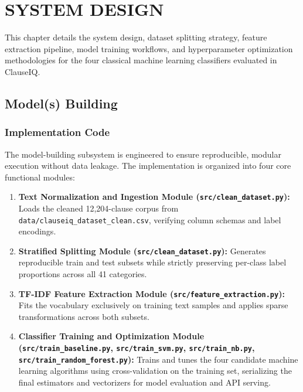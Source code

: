 \chapter{SYSTEM DESIGN}
\label{ch:system_design}

This chapter details the system design, dataset splitting strategy, feature extraction pipeline, model training workflows, and hyperparameter optimization methodologies for the four classical machine learning classifiers evaluated in ClauseIQ.

\section{Model(s) Building}
\label{sec:model_building}

\subsection{Implementation Code}
\label{subsec:implementation_code}
The model-building subsystem is engineered to ensure reproducible, modular execution without data leakage. The implementation is organized into four core functional modules:
\begin{enumerate}
    \item \textbf{Text Normalization and Ingestion Module (\texttt{src/clean\_dataset.py}):} Loads the cleaned 12,204-clause corpus from \texttt{data/clauseiq\_dataset\_clean.csv}, verifying column schemas and label encodings.
    \item \textbf{Stratified Splitting Module (\texttt{src/clean\_dataset.py}):} Generates reproducible train and test subsets while strictly preserving per-class label proportions across all 41 categories.
    \item \textbf{TF-IDF Feature Extraction Module (\texttt{src/feature\_extraction.py}):} Fits the vocabulary exclusively on training text samples and applies sparse transformations across both subsets.
    \item \textbf{Classifier Training and Optimization Module (\texttt{src/train\_baseline.py}, \texttt{src/train\_svm.py}, \texttt{src/train\_nb.py}, \texttt{src/train\_random\_forest.py}):} Trains and tunes the four candidate machine learning algorithms using cross-validation on the training set, serializing the final estimators and vectorizers for model evaluation and API serving.
\end{enumerate}

